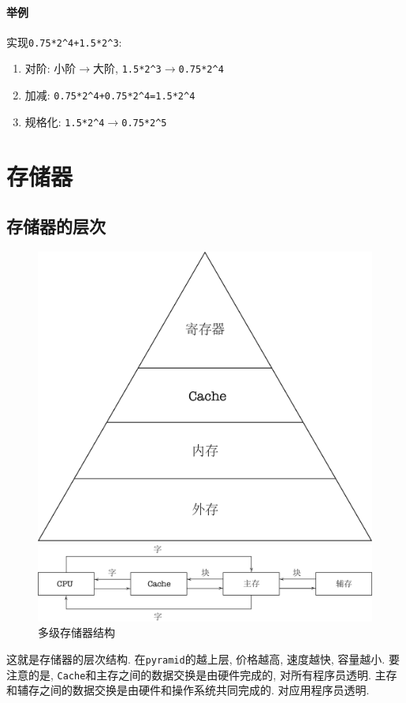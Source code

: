 \subsubsection{举例}
实现\verb|0.75*2^4+1.5*2^3|:
\begin{enumerate}
\item 对阶: 小阶$ \rightarrow $大阶, \verb|1.5*2^3|$ \rightarrow $\verb|0.75*2^4|
\item 加减: \verb|0.75*2^4+0.75*2^4=1.5*2^4|
\item 规格化: \verb|1.5*2^4|$ \rightarrow $\verb|0.75*2^5|
\end{enumerate}
\chapter{存储器}
\section{存储器的层次}
\begin{figure}[H]
\centering
\begin{minipage}{.35\textwidth}
\includegraphics[scale=.3]{img/figure11.pdf}
\end{minipage}
\begin{minipage}{.48\textwidth}
\flushleft
\includegraphics[scale=.3]{img/figure12.pdf}
\end{minipage}
\caption*{多级存储器结构}
\end{figure}
这就是存储器的层次结构. 在\verb|pyramid|的越上层, 价格越高, 速度越快, 容量越小. 要注意的是, \verb|Cache|和主存之间的数据交换是由硬件完成的, 对所有程序员透明. 主存和辅存之间的数据交换是由硬件和操作系统共同完成的. 对应用程序员透明.
